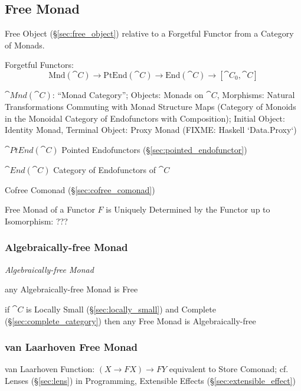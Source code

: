 \subsection{Free Monad}\label{sec:free_monad}

Free Object (\S\ref{sec:free_object}) relative to a Forgetful Functor
from a Category of Monads.

Forgetful Functors:
\[
  \mathrm{Mnd}(\cat{C}) \rightarrow \mathrm{PtEnd}(\cat{C})
  \rightarrow \mathrm{End}(\cat{C}) \rightarrow [\cat{C}_0, \cat{C}]
\]

$\cat{Mnd}(\cat{C})$: ``Monad Category''; Objects: Monads on
$\cat{C}$, Morphisms: Natural Transformations Commuting with Monad
Structure Maps (Category of Monoids in the Monoidal Category of
Endofunctors with Composition); Initial Object: Identity Monad,
Terminal Object: Proxy Monad (FIXME: Haskell `Data.Proxy`)

$\cat{PtEnd}(\cat{C})$ Pointed Endofunctors
(\S\ref{sec:pointed_endofunctor})

$\cat{End}(\cat{C})$ Category of Endofunctors of $\cat{C}$

Cofree Comonad (\S\ref{sec:cofree_comonad})

Free Monad of a Functor $F$ is Uniquely Determined by the Functor up
to Isomorphism: ??? %



\subsubsection{Algebraically-free Monad}\label{sec:algebraically_free}

\emph{Algebraically-free Monad}

any Algebraically-free Monad is Free

if $\cat{C}$ is Locally Small (\S\ref{sec:locally_small}) and Complete
(\S\ref{sec:complete_category}) then any Free Monad is
Algebraically-free



\subsubsection{van Laarhoven Free Monad}
\label{sec:vanlaarhoven_free_monad}

van Laarhoven Function: $(X \rightarrow F X) \rightarrow F Y$ equivalent to
Store Comonad; cf. Lenses (\S\ref{sec:lens}) in Programming, Extensible Effects
(\S\ref{sec:extensible_effect})



